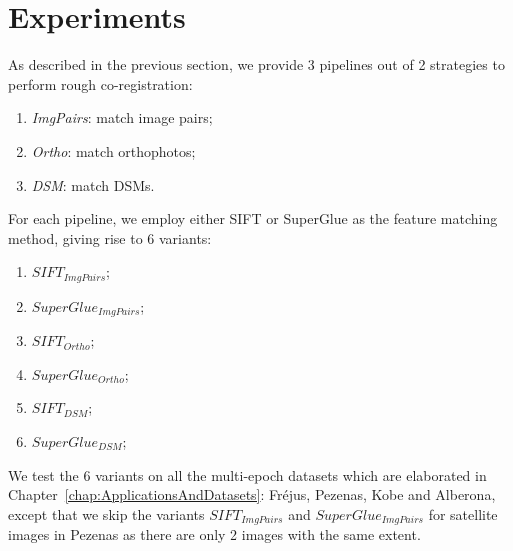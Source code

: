 \section{Experiments}
As described in the previous section, we provide 3 pipelines out of 2 strategies to perform rough co-registration:\\
\begin{enumerate}
	\item \textit{ImgPairs}: match image pairs;
	\item \textit{Ortho}: match orthophotos;
	\item \textit{DSM}: match \ac{DSM}s.
\end{enumerate}
For each pipeline, we employ either SIFT or SuperGlue as the feature matching method, giving rise to 6 variants:\\
\begin{enumerate}
    \item $SIFT_{ImgPairs}$;
    \item $SuperGlue_{ImgPairs}$;
    \item $SIFT_{Ortho}$;
    \item $SuperGlue_{Ortho}$;
    \item $SIFT_{DSM}$;
    \item $SuperGlue_{DSM}$;
\end{enumerate}
We test the 6 variants on all the multi-epoch datasets which are elaborated in Chapter~\ref{chap:ApplicationsAndDatasets}: Fr{\'e}jus, Pezenas, Kobe and Alberona, except that we skip the variants $SIFT_{ImgPairs}$ and $SuperGlue_{ImgPairs}$ for satellite images in Pezenas as there are only 2 images with the same extent.\\



